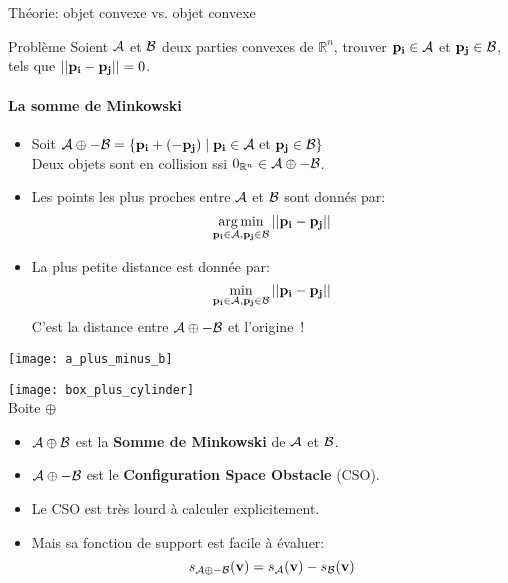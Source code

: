 \begin{frame}{Théorie: objet convexe vs. objet convexe}
     {
    \begin{block}{Problème}
        Soient $\mathcal{A}$ et $\mathcal{B}$ deux parties convexes de
        $\mathbb{R}^n$, trouver ${\bf p_i} \in \mathcal{A}$ et ${\bf p_j} \in
        \mathcal{B}$, tels que $|| {\bf p_i} - {\bf p_j} || = 0$.
    \end{block}
    }
     {
        \framesubtitle{La somme de Minkowski}
     {
    \begin{itemize}
        \item<2-4> Soit $\mathcal{A} \oplus -\mathcal{B} = \{ {\bf p_i} + (-{\bf p_j}) \mid {\bf p_i} \in
            \mathcal{A} \text{ et } {\bf p_j} \in \mathcal{B} \}$\\
            Deux objets sont en collision ssi $0_{\mathbb{R}^n} \in
            \mathcal{A} \oplus -\mathcal{B}$.
        \item<3-4> Les points les plus proches entre $\mathcal{A}$ et
            $\mathcal{B}$ sont donnés par: \[ \operatorname*{arg\,min}\limits_{{\bf p_i} \in
            \mathcal{A}, {\bf p_j} \in \mathcal{B}} || {\bf p_i} - {\bf p_j} || \]
        \item<4> La plus petite distance est donnée par:
            \[ \min\limits_{{\bf p_i} \in \mathcal{A},
            {\bf p_j} \in \mathcal{B}} || {\bf p_i} - {\bf p_j} || \]
            C’est la distance entre $\mathcal{A} \oplus -\mathcal{B}$ et l’origine~!
    \end{itemize}
    }
     {
        \begin{center}
            \texttt{[image: a\_plus\_minus\_b]}
        \end{center}
    }
     {
        \begin{center}
            \texttt{[image: box\_plus\_cylinder]}\\
            Boite $\oplus$ 
        \end{center}
    }
     {
    \begin{itemize}
        \item<7-> $\mathcal{A} \oplus \mathcal{B}$ est la \textbf{Somme de Minkowski} de $\mathcal{A}$ et $\mathcal{B}$.
        \item<8-> $\mathcal{A} \oplus - \mathcal{B}$ est le \textbf{Configuration Space Obstacle} (CSO).
        \item<9-> Le CSO est très lourd à calculer explicitement.
        \item<10-> Mais sa fonction de support est facile à évaluer:
            \[
                s_{\mathcal{A} \oplus - \mathcal{B}}(\textbf{v}) = s_{\mathcal{A}}(\textbf{v}) - s_{\mathcal{B}}(\textbf{v})
            \]
    \end{itemize}
    }
    }
\end{frame}

